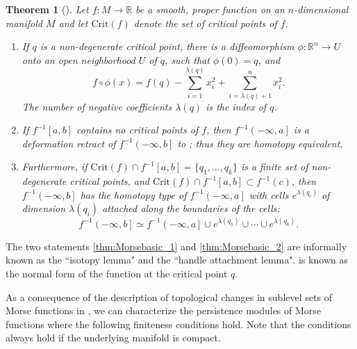 \documentclass[11pt]{article}
\newcommand{\R}{\mathbb{R}}
\newcommand{\level}[2]{{#1}^{-1}\left({#2}\right)}
\newcommand{\sublevel}[2]{{#1}^{-1}\left(-\infty, {#2}\right]}
\newcommand{\intlevel}[3]{{#1}^{-1}\left[{#2}, {#3}\right]}
\theoremstyle{plain}
\newtheorem{thm}{Theorem}
\theoremstyle{definition}
\theoremstyle{remark}
\begin{document}
	\begin{thm}[\cite{milnor_morse_1963}] \label{thm:Morsebasic} Let $f: M \to \R$ be a smooth, proper function on an $n$-dimensional manifold $M$ and let $\mathrm{Crit}(f)$ denote the set of critical points of $f$. 
		\begin{enumerate}[label=(M\arabic*), ref=(M\arabic*), start=0]
			\item If $q$ is a non-degenerate critical point, there is a diffeomorphism $\phi : \R^n \to U$ onto an open neighborhood $U$ of $q$, such that $\phi(0) = q$, and
			\begin{equation} \label{eq:Morsebasic}
				f \circ \phi (x) = f(q) - \sum_{i = 1}^{\lambda(q)} x_i^2 + \sum_{i = \lambda(q) + 1}^{n} x_i^2.
			\end{equation}
			The number of negative coefficients $\lambda(q)$ is the \emph{index} of $q$.
			\item  \label{thm:Morsebasic_1} If $\intlevel{f}{a}{b}$ contains no critical points of $f$, then $\sublevel{f}{a}$ is a deformation retract of $\sublevel{f}{b}$ to ; thus they are homotopy equivalent.
			\item  \label{thm:Morsebasic_2}  Furthermore, if $\mathrm{Crit}(f) \cap \intlevel{f}{a}{b} = \{q_1, \ldots, q_k\}$ is a finite set of non-degenerate critical points, and $\mathrm{Crit}(f) \cap \intlevel{f}{a}{b} \subset \level{f}{c}$,  then $\sublevel{f}{b}$ has the homotopy type of $\sublevel{f}{a}$ with cells $e^{\lambda(q_i)}$ of dimension $\lambda(q_i)$ attached along the boundaries of the cells:
			\begin{equation*}
				\sublevel{f}{b} \simeq \sublevel{f}{a} \cup e^{\lambda(q_1)} \cup \cdots \cup e^{\lambda(q_k)}.
			\end{equation*}
		\end{enumerate}
	\end{thm}
	The two statements \ref{thm:Morsebasic_1} and \ref{thm:Morsebasic_2} are informally known as the ``isotopy lemma" and the ``handle attachment lemma".  is known as the normal form of the function at the critical point $q$.
	
	As a consequence of the description of topological changes in sublevel sets of Morse functions in  , we can characterize the persistence modules of Morse functions where the following finiteness conditions hold. Note that the conditions always hold if the underlying manifold is compact. 
	
\end{document}

